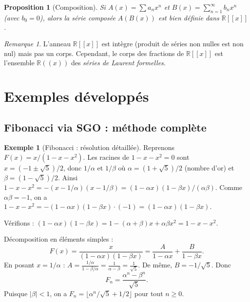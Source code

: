 \documentclass[12pt,a4paper,openany]{book}
\theoremstyle{definition}
\newtheorem{exemple}[definition]{Exemple}
\theoremstyle{plain}
\newtheorem{proposition}[definition]{Proposition}
\theoremstyle{remark}
\newtheorem{remarque}[definition]{Remarque}
\newcommand{\R}{\mathbb{R}}
\newcommand{\abs}[1]{\left|#1\right|}
\begin{document}
\begin{proposition}[Composition]
\label{prop:serie-composition}
Si $A(x) = \sum a_n x^n$ et $B(x) = \sum_{n=1}^\infty b_n x^n$ (avec $b_0 = 0$),
alors la série composée $A(B(x))$ est bien définie dans $\R[[x]]$.
\end{proposition}

\begin{remarque}
\label{rem:anneau-integre}
L'anneau $\R[[x]]$ est intègre (produit de séries non nulles est non nul)
mais pas un corps. Cependant, le corps des fractions de $\R[[x]]$ est l'ensemble
$\R((x))$ des \emph{séries de Laurent formelles}.
\end{remarque}

\section{Exemples développés}
\label{sec:gen-exemples}

\subsection{Fibonacci via SGO : méthode complète}
\label{sec:fibonacci-complet}

\begin{exemple}[Fibonacci : résolution détaillée]
\label{ex:fibonacci-detail}
Reprenons $F(x) = x/(1-x-x^2)$. Les racines de $1-x-x^2 = 0$ sont
$x = (-1 \pm \sqrt{5})/2$, donc $1/\alpha$ et $1/\beta$ où $\alpha = (1+\sqrt{5})/2$
(nombre d'or) et $\beta = (1-\sqrt{5})/2$.
Ainsi $1 - x - x^2 = -(x-1/\alpha)(x-1/\beta) = (1-\alpha x)(1-\beta x)/(\alpha\beta)$.
Comme $\alpha\beta = -1$, on a $1-x-x^2 = -(1-\alpha x)(1-\beta x) \cdot (-1) = (1-\alpha x)(1-\beta x)$.

Vérifions : $(1-\alpha x)(1-\beta x) = 1 - (\alpha+\beta)x + \alpha\beta x^2 = 1 - x - x^2$. \checkmark

Décomposition en éléments simples :
\[
  F(x) = \frac{x}{(1-\alpha x)(1-\beta x)}
    = \frac{A}{1-\alpha x} + \frac{B}{1-\beta x}.
\]
En posant $x = 1/\alpha$ : $A = \frac{1/\alpha}{1-\beta/\alpha} = \frac{1}{\alpha-\beta} = \frac{1}{\sqrt{5}}$.
De même, $B = -1/\sqrt{5}$. Donc
\[
  F_n = \frac{\alpha^n - \beta^n}{\sqrt{5}}.
\]
Puisque $\abs{\beta} < 1$, on a $F_n = \lfloor \alpha^n/\sqrt{5} + 1/2 \rfloor$
pour tout $n \geqslant 0$.
\end{exemple}
\end{document}
